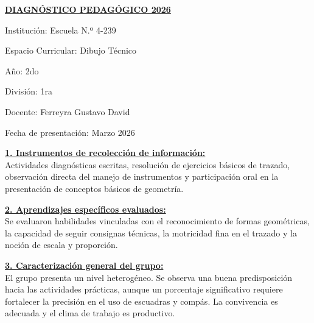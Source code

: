 \documentclass[a4paper]{article}
\begin{document}
\begin{center}
\fontsize{12pt}{14pt}\selectfont\bfseries\underline{DIAGNÓSTICO PEDAGÓGICO 2026}
\end{center}

\noindent Institución: Escuela N.º 4-239 \par
\noindent Espacio Curricular: Dibujo Técnico \par
\noindent Año: 2do \par
\noindent División: 1ra \par
\noindent Docente: Ferreyra Gustavo David \par
\noindent Fecha de presentación: Marzo 2026

\vspace{0.5cm}
\noindent\textbf{\underline{1. Instrumentos de recolección de información:}}\\
\fontsize{11pt}{13pt}\selectfont Actividades diagnósticas escritas, resolución de ejercicios básicos de trazado, observación directa del manejo de instrumentos y participación oral en la presentación de conceptos básicos de geometría.

\vspace{0.5cm}
\noindent\textbf{\underline{2. Aprendizajes específicos evaluados:}}\\
\fontsize{11pt}{13pt}\selectfont Se evaluaron habilidades vinculadas con el reconocimiento de formas geométricas, la capacidad de seguir consignas técnicas, la motricidad fina en el trazado y la noción de escala y proporción.

\vspace{0.5cm}
\noindent\textbf{\underline{3. Caracterización general del grupo:}}\\
\fontsize{11pt}{13pt}\selectfont El grupo presenta un nivel heterogéneo. Se observa una buena predisposición hacia las actividades prácticas, aunque un porcentaje significativo requiere fortalecer la precisión en el uso de escuadras y compás. La convivencia es adecuada y el clima de trabajo es productivo.
\end{document}
